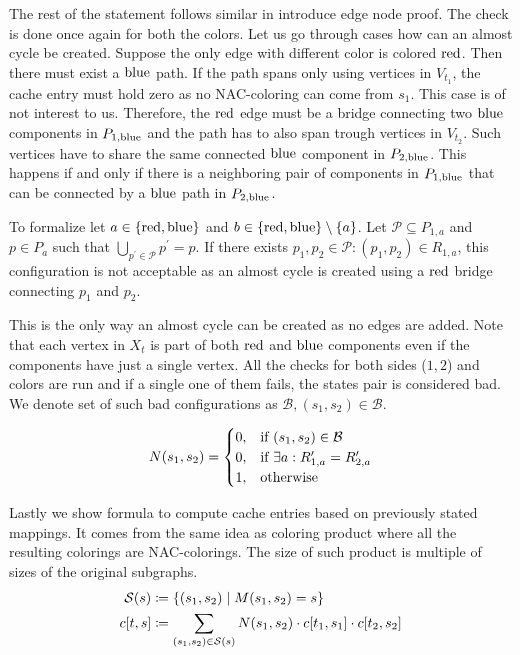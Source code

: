 The rest of the statement follows similar in introduce edge node proof.
The check is done once again for both the colors.
Let us go through cases how can an almost cycle be created.
Suppose the only edge with different color is colored \( \text{red} \).
Then there must exist a \( \text{blue} \) path. If the path spans only using vertices
in \( V_{t_1} \), the cache entry must hold zero as no NAC-coloring can come
from \( s_1 \). This case is of not interest to us.
Therefore, the \( \text{red} \) edge must be
a bridge connecting two \( \text{blue} \) components in \( P_{1,\text{blue}} \) and
the path has to also span trough vertices in \( V_{t_2} \).
Such vertices have to share the same connected \( \text{blue} \) component in \( P_{2,\text{blue}} \).
This happens if and only if there is a neighboring pair of components in \( P_{1,\text{blue}} \)
that can be connected by a \( \text{blue} \) path in \( P_{2,\text{blue}} \).

To formalize let \( a \in \{\text{red}, \text{blue} \}  \) and \( b \in \{\text{red}, \text{blue} \} \setminus \{a\} \).
Let \( \mathcal{P} \subseteq P_{1, a} \)
and \( p \in P_{a} \) such that \( \bigcup_{p^\prime \in \mathcal{P}} p^\prime = p \).
If there exists \( p_1, p_2 \in \mathcal{P} : (p_1, p_2) \in R_{1, a} \),
this configuration is not acceptable as an almost cycle is created
using a \( \text{red} \) bridge connecting \( p_1 \) and \( p_2 \).

This is the only way an almost cycle can be created as no edges are added.
Note that each vertex in \( X_t \) is part of both \( \text{red} \) and \( \text{blue} \)
components even if the components have just a single vertex.
All the checks for both sides (\( 1, 2 \)) and colors are run and
if a single one of them fails, the states pair is considered bad.
We denote set of such bad configurations as \( \mathcal{B}, (s_1, s_2) \in \mathcal{B} \).

%
\begin{align}
	N(s_1, s_2) =
	\begin{cases}
		0, & \text{if } (s_1, s_2) \in \mathcal{B}                  \\
		0, & \text{if } \exists a : R_{1,a}^\prime = R_{2,a}^\prime \\
		1, & \text{otherwise}
	\end{cases}\notag
\end{align}
%

Lastly we show formula to compute cache entries based on previously stated mappings.
It comes from the same idea as coloring product where all the resulting colorings
are NAC-colorings. The size of such product is multiple of sizes of the original subgraphs.
%
\begin{align}
	\mathcal{S}(s) & \coloneqq \{(s_1, s_2) \mid M(s_1, s_2) = s \}   \notag                                                     \\
	c[t, s]        & \coloneqq \sum_{(s_1, s_2) \in \mathcal{S}(s)} N(s_1, s_2) \cdot c[t_1, s_1] \cdot c[t_{2}, s_{2}]   \notag
\end{align}
%

